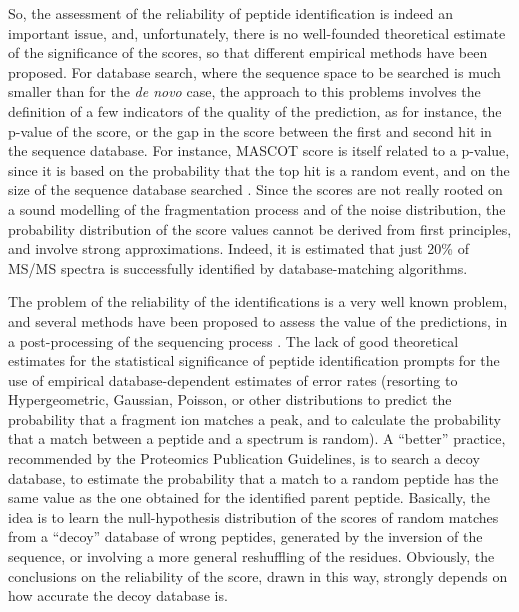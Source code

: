 So, the assessment  of the reliability of peptide  identification is indeed an
important issue, and, unfortunately,  there is no well-founded theoretical
estimate of the significance of the scores, so that  different empirical methods
have been proposed.
For database search, where the sequence space to be searched is much smaller
than for the \emph{de novo} case, the approach to this problems involves the definition
of a few indicators of the quality of the prediction, as for instance, the
p-value of the score, or the gap in the score between the first and second hit
in the sequence database. For instance, MASCOT score is itself related to a
p-value, since it is based on the probability that the top hit is a random
event, and on the size of the sequence database searched
\cite{Menschaert2010}.
Since the scores are not really rooted on a sound modelling of the fragmentation
process and of the noise distribution, the probability distribution of the score
values cannot be derived from first principles, and involve strong
approximations.
Indeed, it is estimated that just 20\% of MS/MS spectra is successfully
identified by database-matching algorithms\cite{Marcotte2007}.


The problem  of the reliability of the identifications  is a very well known
problem, and several methods have been proposed to assess the value of the
predictions, in a post-processing of the sequencing process \cite{Kim2008}. 
The lack of good theoretical estimates for the statistical significance of
peptide identification prompts for the use of empirical database-dependent
estimates of error rates (resorting to Hypergeometric, Gaussian, Poisson, or
other distributions to predict the probability that a fragment ion matches a
peak, and to calculate the probability that a match between a peptide and a
spectrum is random). A ``better'' practice, recommended  by the Proteomics
Publication Guidelines,  is to search  a decoy database, to
estimate the probability that a match to a random peptide has the same value as
the one obtained for the identified parent peptide. Basically, the idea is to
learn the  null-hypothesis distribution of the scores of random matches from a
``decoy'' database of wrong peptides, generated by the inversion of the
sequence, or involving a more general  reshuffling of the residues. Obviously,
the conclusions on the reliability of the score, drawn in this way, strongly
depends on how accurate the decoy database is.

